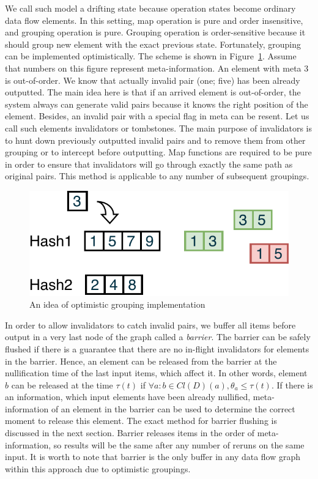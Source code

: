 We call such model a drifting state because operation states become ordinary data flow elements. In this setting, map operation is pure and order insensitive, and grouping operation is pure. Grouping operation is order-sensitive because it should group new element with the exact previous state. Fortunately, grouping can be implemented optimistically. The scheme is shown in Figure~\ref{optimistic-grouping}. Assume that numbers on this figure represent meta-information. An element with meta 3 is out-of-order. We know that actually invalid pair (one; five) has been already outputted. The main idea here is that if an arrived element is out-of-order, the system always can generate valid pairs because it knows the right position of the element. Besides, an invalid pair with a special flag in meta can be resent. Let us call such elements invalidators or tombstones. The main purpose of invalidators is to hunt down previously outputted invalid pairs and to remove them from other grouping or to intercept before outputting. Map functions are required to be pure in order to ensure that invalidators will go through exactly the same path as original pairs. This method is applicable to any number of subsequent groupings.
 
\begin{figure}[htbp]
  \centering
  \includegraphics[width=.35\textwidth]{pics/grouping-invalidation}
  \caption{An idea of optimistic grouping implementation}
  \label {optimistic-grouping}
\end{figure} 
 
In order to allow invalidators to catch invalid pairs, we buffer all items before output in a very last node of the graph called a {\em barrier}. The barrier can be safely flushed if there is a guarantee that there are no in-flight invalidators for elements in the barrier. Hence, an element can be released from the barrier at the nullification time of the last input items, which affect it. In other words, element $b$ can be released at the time $\tau(t)$ if $\forall{a}:b\in{Cl(D)(a)},\theta_a \leq \tau(t)$. If there is an information, which input elements have been already nullified, meta-information of an element in the barrier can be used to determine the correct moment to release this element. The exact method for barrier flushing is discussed in the next section. Barrier releases items in the order of meta-information, so results will be the same after any number of reruns on the same input. It is worth to note that barrier is the only buffer in any data flow graph within this approach due to optimistic groupings. 

